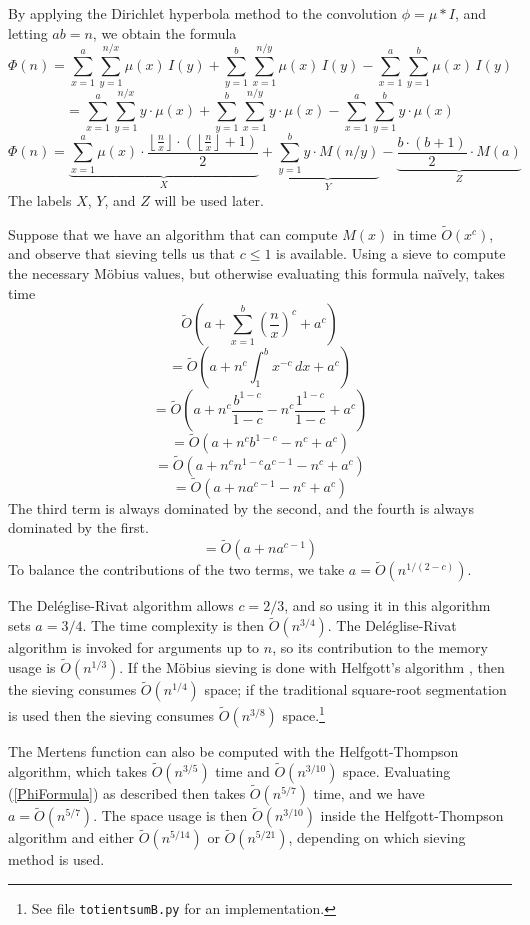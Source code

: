 \documentclass[12pt]{article}
\newcommand{\eqn}[1]{\begin{displaymath} #1 \end{displaymath}}
\newcommand{\neqn}[1]{\begin{equation} #1 \end{equation}}
\newcommand{\floor}[1]{{\left\lfloor #1 \right\rfloor}}
\newcommand{\integral}[4]{\displaystyle\int_{#3}^{#4} \! #1 \, d#2}
\newcommand{\floordiv}[2]{\floor{\frac{#1}{#2}}}
\begin{document}
By applying the Dirichlet hyperbola method to the convolution $\phi = \mu * I$, and letting $ab=n$, we obtain the formula
\eqn{\Phi(n) = \sum_{x=1}^{a}\sum_{y=1}^{n/x} \mu(x) \, I(y) + \sum_{y=1}^{b}\sum_{x=1}^{n/y} \mu(x) \, I(y) - \sum_{x=1}^{a}\sum_{y=1}^{b} \mu(x) \, I(y)}
\eqn{ = \sum_{x=1}^{a}\sum_{y=1}^{n/x} y \cdot \mu(x) + \sum_{y=1}^{b}\sum_{x=1}^{n/y} y \cdot \mu(x) - \sum_{x=1}^{a}\sum_{y=1}^{b} y \cdot \mu(x)}
\neqn{\Phi(n) = \underbrace{\sum_{x=1}^{a} \mu(x) \cdot \frac{\floordiv{n}{x} \cdot \left(\floordiv{n}{x} + 1\right)}{2}}_{X} + \underbrace{\sum_{y=1}^{b} y \cdot M(n/y)}_{Y} - \underbrace{\frac{b \cdot (b+1)}{2} \cdot M(a)}_{Z} \label{PhiFormula}}
The labels $X$, $Y$, and $Z$ will be used later.

Suppose that we have an algorithm that can compute $M(x)$ in time $\widetilde{O}(x^c)$, and observe that sieving tells us that $c\leq1$ is available.  Using a sieve to compute the necessary M\"obius values, but otherwise evaluating this formula na\"{i}vely, takes time
\eqn{\widetilde{O}\left( a + \sum_{x=1}^b \left(\frac{n}{x}\right)^c + a^c \right)}
\eqn{=\widetilde{O}\left( a + n^c \integral{x^{-c}}{x}{1}{b} + a^c \right)}
\eqn{=\widetilde{O}\left( a + n^c\frac{b^{1-c}}{1-c} - n^c\frac{1^{1-c}}{1-c} + a^c \right)}
\eqn{=\widetilde{O}\left( a + n^c b^{1-c} - n^c + a^c \right)}
\eqn{=\widetilde{O}\left( a + n^c n^{1-c} a^{c-1} - n^c + a^c \right)}
\eqn{=\widetilde{O}\left( a + n a^{c-1} - n^c + a^c \right)}
The third term is always dominated by the second, and the fourth is always dominated by the first.
\eqn{=\widetilde{O}\left( a + n a^{c-1} \right)}
To balance the contributions of the two terms, we take $a = \widetilde{O}(n^{1/(2-c)})$.

The Del\'{e}glise-Rivat algorithm \cite{DR1996} allows $c=2/3$, and so using it in this algorithm sets $a=3/4$.  The time complexity is then $\widetilde{O}(n^{3/4})$. 
 The Del\'{e}glise-Rivat algorithm is invoked for arguments up to $n$, so its contribution to the memory usage is $\widetilde{O}(n^{1/3})$.  If the M\"{o}bius sieving is done with Helfgott's algorithm \cite{Helfgott2020}, then the sieving consumes $\widetilde{O}(n^{1/4})$ space; if the traditional square-root segmentation is used then the sieving consumes $\widetilde{O}(n^{3/8})$ space.\footnote{See file \texttt{totientsumB.py} for an implementation.}

The Mertens function can also be computed with the Helfgott-Thompson algorithm, which takes $\widetilde{O}(n^{3/5})$ time and $\widetilde{O}(n^{3/10})$ space.  Evaluating (\ref{PhiFormula}) as described then takes $\widetilde{O}(n^{5/7})$ time, and we have $a = \widetilde{O}(n^{5/7})$.  The space usage is then $\widetilde{O}(n^{3/10})$ inside the Helfgott-Thompson algorithm and either $\widetilde{O}(n^{5/14})$ or $\widetilde{O}(n^{5/21})$, depending on which sieving method is used.
\end{document}
